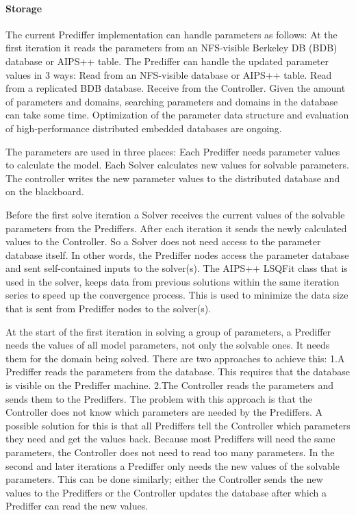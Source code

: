 \documentclass[10pt]{lofar}
\begin{document}
\paragraph{Storage}
The current Prediffer implementation can handle parameters as follows:
At the first iteration it reads the parameters from an NFS-visible Berkeley DB (BDB) database or AIPS++ table.
The Prediffer can handle the updated parameter values in 3 ways:
Read from an NFS-visible database or AIPS++ table.
Read from a replicated BDB database.
Receive from the Controller.
Given the amount of parameters and domains, searching parameters and domains in the database can take some time. Optimization of the parameter data structure and evaluation of high-performance distributed embedded databases are ongoing.

The parameters are used in three places:
Each Prediffer needs parameter values to calculate the model.
Each Solver calculates new values for solvable parameters.
The controller writes the new parameter values to the distributed database and on the blackboard.

Before the first solve iteration a Solver receives the current values of the solvable parameters from the Prediffers. After each iteration it sends the newly calculated values to the Controller. So a Solver does not need access to the parameter database itself. In other words, the Prediffer nodes access the parameter database and sent self-contained inputs to the solver(s).
The AIPS++ LSQFit class that is used in the solver, keeps data from previous solutions within the same iteration series to speed up the convergence process. This is used to minimize the data size that is sent from Prediffer nodes to the solver(s).

At the start of the first iteration in solving a group of parameters, a Prediffer needs the values of all model parameters, not only the solvable ones. It needs them for the domain being solved. There are two approaches to achieve this:
1.A Prediffer reads the parameters from the database. This requires that the database is visible on the Prediffer machine.
2.The Controller reads the parameters and sends them to the Prediffers.
The problem with this approach is that the Controller does not know which parameters are needed by the Prediffers. A possible solution for this is that all Prediffers tell the Controller which parameters they need and get the values back. Because most Prediffers will need the same parameters, the Controller does not need to read too many parameters.
In the second and later iterations a Prediffer only needs the new values of the solvable parameters. This can be done similarly; either the Controller sends the new values to the Prediffers or the Controller updates the database after which a Prediffer can read the new values.
\end{document}
